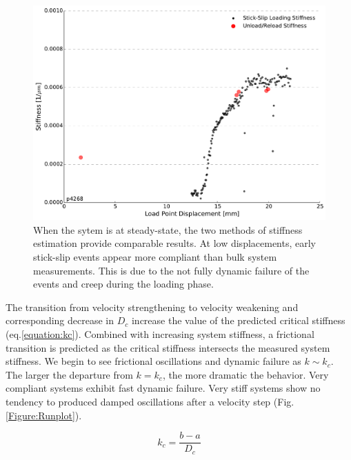 \documentclass[11pt]{article}
\begin{document}
\begin{figure}
    \centering
        \includegraphics[scale=0.4]{../Figures/Fig_Stiffness_Methods/Stiffness_Methods.pdf}
       \caption{When the sytem is at steady-state, the two methods of stiffness
       estimation provide comparable results. At low displacements, early stick-slip
       events appear more compliant than bulk system measurements. This is due to the
       not fully dynamic failure of the events and creep during the loading phase.}
      \label{Figure:Stiffness Methods}
\end{figure}

The transition from velocity strengthening to velocity weakening and
corresponding decrease in $D_c$ increase the value of the predicted critical
stiffness (eq.\ref{equation:kc}). Combined with increasing system stiffness,
a frictional transition is predicted as the critical stiffness intersects the
measured system stiffness. We begin to see frictional oscillations and dynamic
failure as $k \sim k_c$. The larger the departure from $k=k_c$, the more dramatic the behavior.
Very compliant systems exhibit fast dynamic failure. Very stiff systems show no
tendency to produced damped oscillations after a
velocity step (Fig.\ref{Figure:Runplot}).

\begin{equation}
    k_c = \frac{b-a}{D_c}
	\label{equation:kc}
\end{equation}
\end{document}
